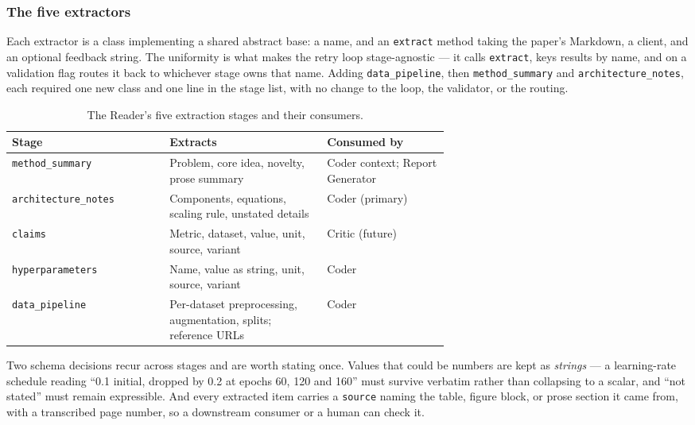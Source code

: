 \documentclass[10pt,twocolumn]{article}
\begin{document}
\subsubsection{The five extractors}

Each extractor is a class implementing a shared abstract base: a name, and an
\texttt{extract} method taking the paper's Markdown, a client, and an optional feedback
string. The uniformity is what makes the retry loop stage-agnostic --- it calls
\texttt{extract}, keys results by name, and on a validation flag routes it back to
whichever stage owns that name. Adding \texttt{data\_pipeline}, then
\texttt{method\_summary} and \texttt{architecture\_notes}, each required one new class and
one line in the stage list, with no change to the loop, the validator, or the routing.

\begin{table}[htbp]
\centering
\small
\caption{The Reader's five extraction stages and their consumers.}
\label{tab:extractors}
\begin{tabular}{lp{0.36\linewidth}p{0.28\linewidth}}
\toprule
Stage & Extracts & Consumed by \\
\midrule
\texttt{method\_summary}     & Problem, core idea, novelty, prose summary & Coder context;
                                                                            Report Generator \\
\texttt{architecture\_notes} & Components, equations, scaling rule, unstated details &
                                                                            Coder (primary) \\
\texttt{claims}              & Metric, dataset, value, unit, source, variant & Critic
                                                                            (future) \\
\texttt{hyperparameters}     & Name, value as string, unit, source, variant & Coder \\
\texttt{data\_pipeline}      & Per-dataset preprocessing, augmentation, splits; reference
                               URLs & Coder \\
\bottomrule
\end{tabular}
\end{table}

Two schema decisions recur across stages and are worth stating once. Values that could be
numbers are kept as \emph{strings} --- a learning-rate schedule reading ``0.1 initial,
dropped by 0.2 at epochs 60, 120 and 160'' must survive verbatim rather than collapsing to
a scalar, and ``not stated'' must remain expressible. And every extracted item carries a
\texttt{source} naming the table, figure block, or prose section it came from, with a
transcribed page number, so a downstream consumer or a human can check it.
\end{document}
